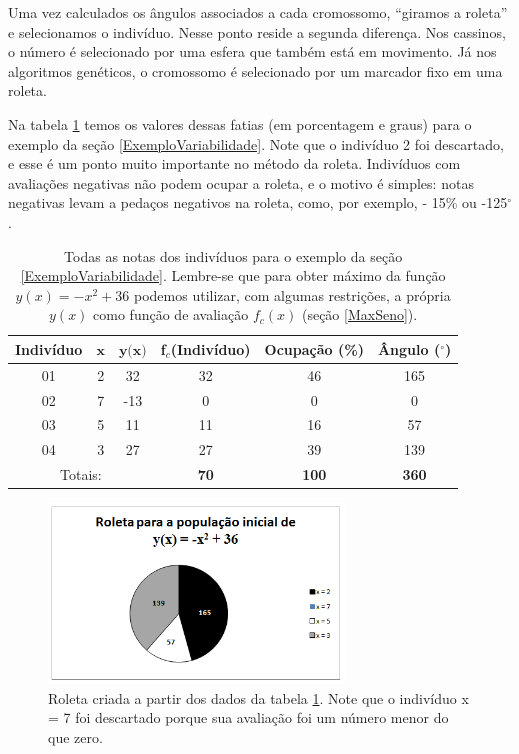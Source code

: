 	Uma vez calculados os ângulos associados a cada cromossomo, ``giramos a roleta'' e selecionamos o indivíduo. Nesse ponto reside a segunda diferença. Nos cassinos, o número é selecionado por uma esfera que também está em movimento. Já nos algoritmos genéticos, o cromossomo é selecionado por um marcador fixo em uma roleta.
	
	Na tabela \ref{tabSumFitness} temos os valores dessas fatias (em porcentagem e graus) para o exemplo da seção \ref{ExemploVariabilidade}. Note que o indivíduo 2 foi descartado, e esse é um ponto muito importante no método da roleta. Indivíduos com avaliações negativas não podem ocupar a roleta, e o motivo é simples: notas negativas levam a pedaços negativos na roleta, como, por exemplo, - 15\% ou -125$^\circ$.
		
	\begin{table}[htp]		
		\caption{\label{tabSumFitness}Todas as notas dos indivíduos para o exemplo da seção \ref{ExemploVariabilidade}. Lembre-se que para obter máximo da função $y(x) = -x^2 + 36$ podemos utilizar, com algumas restrições, a própria $y(x)$ como função de avaliação $f_c(x)$ (seção \ref{MaxSeno}).}
		\begin{center}
			\begin{tabular}{c|c|c|c|c|c}
				\hline
				\textbf{Indivíduo}	& $\textbf{x}$		& $\textbf{y(x)}$	& \textbf{f$_c$(Indivíduo)} & \textbf{Ocupação (\%)} & \textbf{Ângulo ($^\circ$)} \\
				\hline
				01	& 2	& 32  & 32 	& 46	& 165 						\\
				02	& 7	& -13 & 0		& 0		& 0						\\
				03	&	5	& 11	& 11	& 16	& 57						\\	
				04	&	3	& 27	& 27	& 39	& 139						\\
				\hline
				\multicolumn{3}{c|}{Totais:}  & \textbf{70} & \textbf{100} & \textbf{360} \\
				\hline
			\end{tabular}
		\end{center}
	\end{table}
	
	
	\begin{figure}[htp]
		\begin{center}
			\includegraphics[width=0.7\textwidth]{figs/ga/roleta_viciada.png}
		\end{center}
		\caption{\label{figRoleta}Roleta criada a partir dos dados da tabela \ref{tabSumFitness}. Note que o indivíduo x = 7 foi descartado porque sua avaliação foi um número menor do que zero.}
	\end{figure}
	
